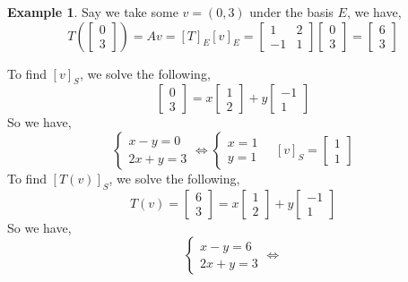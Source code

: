 \documentclass{report}
\theoremstyle{definition}
\newtheorem{ex}{Example}[section]
\theoremstyle{remark}
\begin{document}
\begin{ex}
Say we take some $v=(0,3)$ under the basis $E$, we have,
\[
T\left(\begin{bmatrix}
0 \\ 3
\end{bmatrix}\right)=
Av=[T]_E[v]_E=
\begin{bmatrix}
1 & 2 \\ -1 & 1
\end{bmatrix}
\begin{bmatrix}
0 \\ 3
\end{bmatrix}=
\begin{bmatrix}
6 \\ 3
\end{bmatrix}
\]

To find $[v]_S$, we solve the following,
\[
\begin{bmatrix}
0 \\ 3
\end{bmatrix}=
x\begin{bmatrix}
1 \\ 2
\end{bmatrix}+
y\begin{bmatrix}
-1 \\ 1
\end{bmatrix}
\]
So we have,
\[
\left\lbrace\begin{array}{l}
x-y=0\\
2x+y=3
\end{array}\right.
\Leftrightarrow
\left\lbrace\begin{array}{l}
x=1\\
y=1
\end{array}\right.\quad
[v]_S=\begin{bmatrix}
1 \\ 1
\end{bmatrix}
\]
To find $[T(v)]_S$, we solve the following,
\[
T(v)=\begin{bmatrix}
6 \\ 3
\end{bmatrix}=
x\begin{bmatrix}
1 \\ 2
\end{bmatrix}+
y\begin{bmatrix}
-1 \\ 1
\end{bmatrix}
\]
So we have,
\[
\left\lbrace\begin{array}{l}
x-y=6\\
2x+y=3
\end{array}\right.
\Leftrightarrow
\]
\end{ex}
\end{document}
